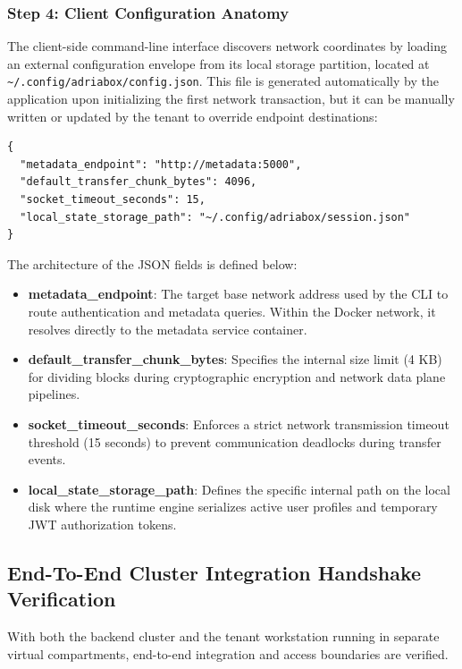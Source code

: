 \subsubsection{Step 4: Client Configuration Anatomy}
The client-side command-line interface discovers network coordinates by loading an external configuration envelope from its local storage partition, located at \texttt{\~{}/.config/adriabox/config.json}. This file is generated automatically by the application upon initializing the first network transaction, but it can be manually written or updated by the tenant to override endpoint destinations:

\begin{lstlisting}[basicstyle=\small\ttfamily, frame=single, keepspaces=true, columns=flexible]
{
  "metadata_endpoint": "http://metadata:5000",
  "default_transfer_chunk_bytes": 4096,
  "socket_timeout_seconds": 15,
  "local_state_storage_path": "~/.config/adriabox/session.json"
}
\end{lstlisting}

The architecture of the JSON fields is defined below:
\begin{itemize}
    \item \textbf{metadata\_endpoint}: The target base network address used by the CLI to route authentication and metadata queries. Within the Docker network, it resolves directly to the metadata service container.
    \item \textbf{default\_transfer\_chunk\_bytes}: Specifies the internal size limit (4 KB) for dividing blocks during cryptographic encryption and network data plane pipelines.
    \item \textbf{socket\_timeout\_seconds}: Enforces a strict network transmission timeout threshold (15 seconds) to prevent communication deadlocks during transfer events.
    \item \textbf{local\_state\_storage\_path}: Defines the specific internal path on the local disk where the runtime engine serializes active user profiles and temporary JWT authorization tokens.
\end{itemize}

\subsection{End-To-End Cluster Integration Handshake Verification}
With both the backend cluster and the tenant workstation running in separate virtual compartments, end-to-end integration and access boundaries are verified.

